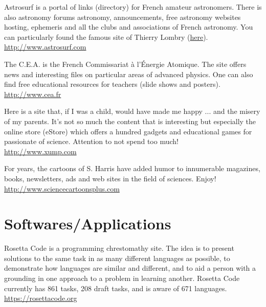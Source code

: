 	{\Large {}}{\Large {}}{\Large {}}{\Large {}}{\Large {}}{\Large {}}{\Large {}}{\Large {}}\bcdfrance{} Astrosurf is a portal of links (directory) for French amateur astronomers. There is also astronomy forums astronomy, announcements, free astronomy websites hosting, ephemeris and all the clubs and associations of French astronomy. You can particularly found the famous site of Thierry Lombry (\href{http://astrosurf.com/luxorion/}{\color{blue}here}).\\
	\href{http://www.astrosurf.com}{\color{blue}http://www.astrosurf.com}
	
	{\Large {}}{\Large {}}\bcdfrance{} The C.E.A. is the French Commissariat à l'Énergie Atomique. The site offers news and interesting files on particular areas of advanced physics. One can also find free educational resources for teachers (slide shows and posters).\\
	\href{http://www.cea.fr}{\color{blue}http://www.cea.fr}
	
	{\Large {}}{\Large {}} Here is a site that, if I was a child, would have made me happy ... and the misery of my parents. It's not so much the content that is interesting but especially the online store (eStore) which offers a hundred gadgets and educational games for passionate of science. Attention to not spend too much!\\
	\href{http://www.xump.com}{\color{blue}http://www.xump.com}
	
	{\Large {}}{\Large {}} For years, the cartoons of S. Harris have added humor to innumerable magazines, books, newsletters, ads and web sites in the field of sciences. Enjoy!\\
	\href{http://www.sciencecartoonsplus.com}{\color{blue}http://www.sciencecartoonsplus.com}
	
	\pagebreak
	\section{Softwares/Applications}
	{\Large {}}{\Large {}}{\Large {}} Rosetta Code is a programming chrestomathy site. The idea is to present solutions to the same task in as many different languages as possible, to demonstrate how languages are similar and different, and to aid a person with a grounding in one approach to a problem in learning another. Rosetta Code currently has 861 tasks, 208 draft tasks, and is aware of 671 languages.\\
	\href{https://rosettacode.org/wiki/Category:Programming_Tasks}{\color{blue}https://rosettacode.org}
	
